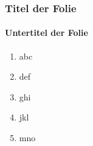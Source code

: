 \documentclass[ngerman]{beamer}
\begin{document}
\begin{frame}
\frametitle{Titel der Folie}
\framesubtitle{Untertitel der Folie}

\begin{enumerate}
\item<1-> abc
\item<2> def
\item<-3> ghi
\item<4-> jkl
\item<5-> mno
\end{enumerate}


\end{frame}
\end{document}
